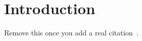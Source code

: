 \section{Introduction}
\label{sec:intro}

Remove this once you add a real citation~\cite{AliceETAL42DumbBib}.
